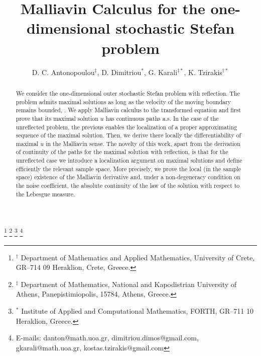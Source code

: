 \documentclass[reqno]{amsart}
\numberwithin{equation}{section}
\begin{document}
\title[Malliavin Calculus for the one-dimensional stochastic Stefan problem]
{Malliavin Calculus for the one-dimensional stochastic Stefan problem
}


\author[Antonopoulou, Dimitriou, Karali, Tzirakis]{D. C. Antonopoulou$^{\ddag}$, D. Dimitriou$^{*}$, G. Karali$^{\ddag *}$, K. Tzirakis$^{\dag *}$}




\thanks
{$^{\dag}$ Department of Mathematics and Applied Mathematics,
University of Crete, GR--714 09 Heraklion, Crete, Greece.} %
\thanks
{$^{\ddag}$ Department of Mathematics, National and Kapodistrian
University of Athens, Panepistimiopolis, 15784, Athens,
Greece.}%
\thanks
{$^{*}$ Institute of Applied and Computational Mathematics,
FORTH, GR--711 10 Heraklion, Greece.}
\thanks{E-mails: danton@math.uoa.gr, dimitriou.dimos@gmail.com,
gkarali@math.uoa.gr, kostas.tzirakis@gmail.com}



%
%
\begin{abstract}
We consider the one-dimensional outer stochastic Stefan problem with reflection. %
The problem admits maximal solutions as long as the velocity of the moving boundary remains bounded, \cite{AFK2,BH,BH2}. We apply Malliavin calculus to the transformed equation and first prove that its maximal solution $u$ has continuous paths a.s. In the case of the unreflected problem, the previous enables the localization of a proper approximating sequence of the maximal solution. Then, we derive there locally the differentiability of maximal $u$ in the Malliavin sense. The novelty of this work, apart from the derivation of continuity of the paths for the maximal solution with reflection, is that for the unreflected case we introduce a localization argument on maximal solutions and define efficiently the relevant sample space. More precisely, we prove the local (in the sample space) existence of the Malliavin derivative and, under a non-degeneracy condition on the noise coefficient, the absolute continuity of the law of the solution with respect to the Lebesgue measure.
\end{abstract}
\end{document}
